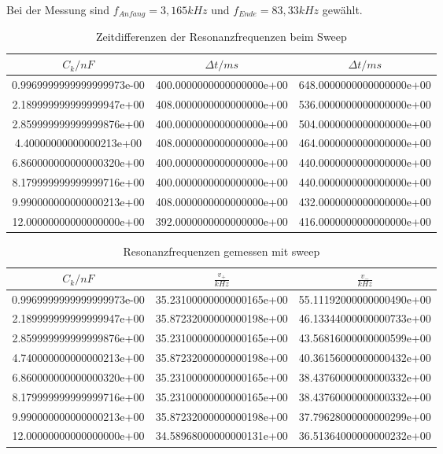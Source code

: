 Bei der Messung sind $f_{Anfang} = 3,165kHz$ und $f_{Ende} = 83,33kHz$ gewählt.

\begin{table}
  \centering
\caption{Zeitdifferenzen der Resonanzfrequenzen beim Sweep}
\label{tab:sweep}
\begin{tabular}{S S S}
  \toprule
  {$C_k/nF$} & {$\Delta t/ms$} & {$\Delta t/ms$}\\
  \midrule
  0.9969999999999999973e-00 & 400.0000000000000000e+00 & 648.0000000000000000e+00\\
  2.189999999999999947e+00 & 408.0000000000000000e+00 & 536.0000000000000000e+00\\
  2.859999999999999876e+00 & 400.0000000000000000e+00 & 504.0000000000000000e+00\\
  4.40000000000000213e+00 & 408.0000000000000000e+00 & 464.0000000000000000e+00\\
  6.860000000000000320e+00 & 400.0000000000000000e+00 & 440.0000000000000000e+00\\
  8.179999999999999716e+00 & 400.0000000000000000e+00 & 440.0000000000000000e+00\\
  9.990000000000000213e+00 & 408.0000000000000000e+00 & 432.0000000000000000e+00\\
  12.00000000000000000e+00 & 392.0000000000000000e+00 & 416.0000000000000000e+00\\
\bottomrule
\end{tabular}
\end{table}
\FloatBarrier

\begin{table}
  \centering
\caption{Resonanzfrequenzen gemessen mit sweep}
\label{tab:sweep}
\begin{tabular}{S S S}
  \toprule
  {$C_k/nF$} & {$\frac{v_+}{kHz}$} & {$\frac{v_-}{kHz}$}\\
  \midrule
  0.9969999999999999973e-00 & 35.23100000000000165e+00 & 55.11192000000000490e+00\\
  2.189999999999999947e+00 & 35.87232000000000198e+00 & 46.13344000000000733e+00\\
  2.859999999999999876e+00 & 35.23100000000000165e+00 & 43.56816000000000599e+00\\
  4.740000000000000213e+00 & 35.87232000000000198e+00 & 40.36156000000000432e+00\\
  6.860000000000000320e+00 & 35.23100000000000165e+00 & 38.43760000000000332e+00\\
  8.179999999999999716e+00 & 35.23100000000000165e+00 & 38.43760000000000332e+00\\
  9.990000000000000213e+00 & 35.87232000000000198e+00 & 37.79628000000000299e+00\\
  12.00000000000000000e+00 & 34.58968000000000131e+00 & 36.51364000000000232e+00\\

\bottomrule
\end{tabular}
\end{table}
\FloatBarrier


